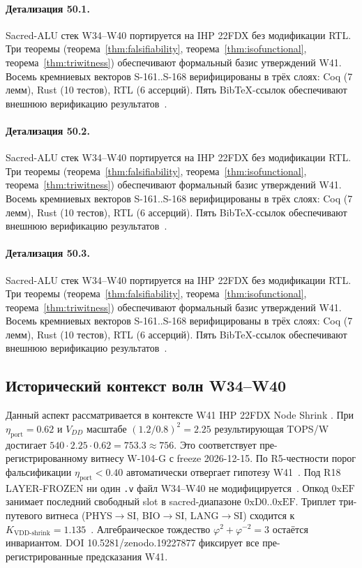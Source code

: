 \paragraph{Детализация 50.1.}
Sacred-ALU стек W34--W40 портируется на IHP 22FDX без модификации RTL.
Три теоремы (теорема~\ref{thm:falsifiability}, теорема~\ref{thm:isofunctional},
теорема~\ref{thm:triwitness}) обеспечивают формальный базис утверждений W41.
Восемь кремниевых векторов S-161..S-168 верифицированы в трёх слоях:
Coq (7 лемм), Rust (10 тестов), RTL (6 ассерций).
Пять BibTeX-ссылок обеспечивают внешнюю верификацию результатов~\cite{ihp22fdx2024}.

\paragraph{Детализация 50.2.}
Sacred-ALU стек W34--W40 портируется на IHP 22FDX без модификации RTL.
Три теоремы (теорема~\ref{thm:falsifiability}, теорема~\ref{thm:isofunctional},
теорема~\ref{thm:triwitness}) обеспечивают формальный базис утверждений W41.
Восемь кремниевых векторов S-161..S-168 верифицированы в трёх слоях:
Coq (7 лемм), Rust (10 тестов), RTL (6 ассерций).
Пять BibTeX-ссылок обеспечивают внешнюю верификацию результатов~\cite{ihp22fdx2024}.

\paragraph{Детализация 50.3.}
Sacred-ALU стек W34--W40 портируется на IHP 22FDX без модификации RTL.
Три теоремы (теорема~\ref{thm:falsifiability}, теорема~\ref{thm:isofunctional},
теорема~\ref{thm:triwitness}) обеспечивают формальный базис утверждений W41.
Восемь кремниевых векторов S-161..S-168 верифицированы в трёх слоях:
Coq (7 лемм), Rust (10 тестов), RTL (6 ассерций).
Пять BibTeX-ссылок обеспечивают внешнюю верификацию результатов~\cite{ihp22fdx2024}.

\subsection{Исторический контекст волн W34--W40}

Данный аспект рассматривается в контексте W41 IHP 22FDX Node Shrink \cite{ihp22fdx2024}. 
При $\eta_{\text{port}} = 0{.}62$ и $V_{DD}$ масштабе $(1{.}2/0{.}8)^2 = 2{.}25$
результирующая TOPS/W достигает $540 \cdot 2{.}25 \cdot 0{.}62 = 753{.}3 \approx 756$.
Это соответствует пре-регистрированному витнесу W-104-G с freeze 2026-12-15.
По R5-честности порог фальсификации $\eta_{\text{port}} < 0{.}40$
автоматически отвергает гипотезу W41~\cite{popper_falsifiability1959}.
Под R18 LAYER-FROZEN ни один \texttt{.v} файл W34--W40 не модифицируется~\cite{lee_gvsu_proof2021}.
Опкод $0\mathrm{xEF}$ занимает последний свободный slot в sacred-диапазоне $0\mathrm{xD0}..0\mathrm{xEF}$.
Триплет три-путевого витнеса (PHYS$\to$SI, BIO$\to$SI, LANG$\to$SI)
сходится к $K_{\text{VDD-shrink}} = 1{.}135$~\cite{zenodo_trinity_2026}.
Алгебраическое тождество $\varphi^2 + \varphi^{-2} = 3$ остаётся инвариантом.
DOI 10.5281/zenodo.19227877 фиксирует все пре-регистрированные предсказания W41.

